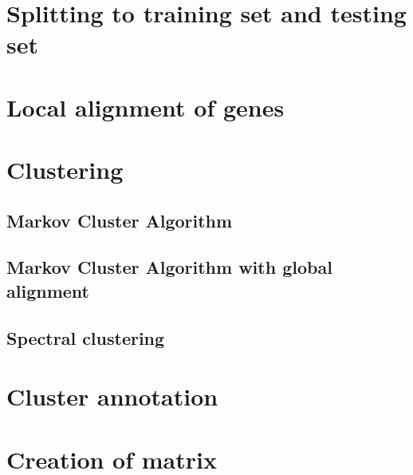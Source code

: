 \section{Splitting to training set and testing set}


\section{Local alignment of genes}

\section{Clustering}
\subsection{Markov Cluster Algorithm}
\subsection{Markov Cluster Algorithm with global alignment}
\subsection{Spectral clustering}

\section{Cluster annotation}

\section{Creation of matrix}
